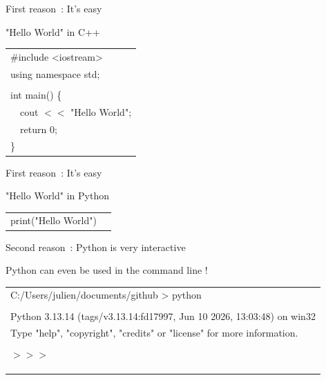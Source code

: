 \documentclass[serif, aspectratio=169]{beamer}
\newenvironment{CLI} %
    {
    \noindent
    \ttfamily 
    \footnotesize
    \begin{tcolorbox}[colback=gray!150,colframe=black]
    \color{white}
    \begin{tabular}{p{4.5cm}p{7.5cm}}
    }
    { 
    \end{tabular}
    \end{tcolorbox}
    }
\begin{document}
\begin{frame}{First reason~: It's easy}
    \begin{block}{"Hello World" in C++}
        \vspace{2pt}
        \begin{CLI}
            \textcolor{purple!50}{\#include} \textcolor{blue!50}{<iostream>} & \\
            \textcolor{purple!50}{using} \textcolor{blue!50}{namespace} \textcolor{green!50}{std}; & \\
            & \\
            \textcolor{red!50}{int} \textcolor{purple!50}{main()} \{ & \\
            \multicolumn{2}{l}{~~cout $<$$<$ \textcolor{blue!50}{"Hello World"};} \\
            \multicolumn{2}{l}{~~\textcolor{purple!50}{return} 0;} \\
            \} & \\
        \end{CLI}
    \end{block}
\end{frame}

\begin{frame}{First reason~: It's easy}
    \begin{block}{"Hello World" in Python}
        \vspace{2pt}
        \begin{CLI}
            \textcolor{purple!50}{print}(\textcolor{blue!50}{"Hello World"}) & \\
        \end{CLI}
    \end{block}
\end{frame}

\begin{frame}{Second reason~: Python  is very interactive}
    \begin{block}{Python can even be used in the command line !}
        \vspace{2pt}
        \begin{CLI}
            \multicolumn{2}{l}{C:/Users/julien/documents/github > python} \\
            & \\
            \multicolumn{2}{l}{Python 3.13.14 (tags/v3.13.14:fd17997, Jun 10 2026, 13:03:48) on win32} \\
            \multicolumn{2}{l}{Type "help", "copyright", "credits" or "license" for more information.} \\
            & \\
            \multicolumn{2}{l}{$>$$>$$>$ \only<2->{print("Hello World")}} \\
            \only<2->{Hello World} & \\
            & \\
            & \\
        \end{CLI}
    \end{block}
\end{frame}
\end{document}
